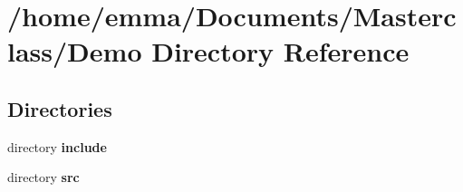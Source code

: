 \section{/home/emma/\+Documents/\+Masterclass/\+Demo Directory Reference}
\label{dir_6e03faf796be06c622ece041967db0ea}
\subsection*{Directories}
\begin{DoxyCompactItemize}
\item 
directory \textbf{ include}
\item 
directory \textbf{ src}
\end{DoxyCompactItemize}

